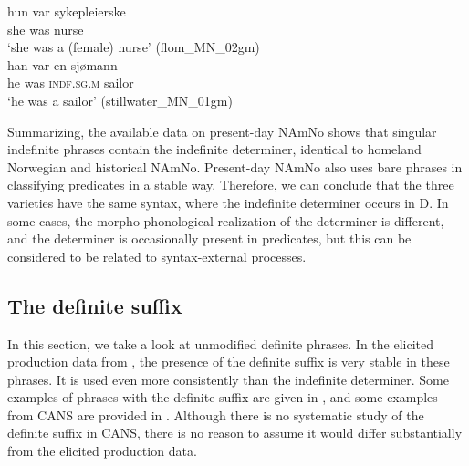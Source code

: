 \documentclass[output=paper]{langscibook}
\begin{document}
\ea \label{ex:vanbaal:22}
\ea \label{ex:vanbaal:22a}
\gll hun var sykepleierske \\
she was nurse \\
\glt `she was a (female) nurse' (flom\_MN\_02gm) \\
\citep[9]{Kinn2020}
\ex  \label{ex:vanbaal:22b}
\gll han var en sjømann \\
he was \textsc{indf.sg.m} sailor \\
\glt `he was a sailor' (stillwater\_MN\_01gm) \\
\citep[9]{Kinn2020}
\z
\z

Summarizing, the available data on present-day NAmNo shows that singular indefinite phrases contain the indefinite determiner, identical to homeland Norwegian and historical NAmNo. Present-day NAmNo also uses bare phrases in classifying predicates in a stable way. Therefore, we can conclude that the three varieties have the same syntax, where the indefinite determiner occurs in D. In some cases, the morpho-phonological realization of the determiner is different, and the determiner is occasionally present in predicates, but this can be considered to be related to syntax-external processes.
 

\subsection{The definite suffix} \label{Sect-DefiniteSuffix}
In this section, we take a look at unmodified definite phrases. In the elicited production data from \citet{vanBaal2020}, the presence of the definite suffix is very stable in these phrases. It is used even more consistently than the indefinite determiner. Some examples of phrases with the definite suffix are given in , and some examples from CANS are provided in . Although there is no systematic study of the definite suffix in CANS, there is no reason to assume it would differ substantially from the elicited production data.
 
\end{document}
